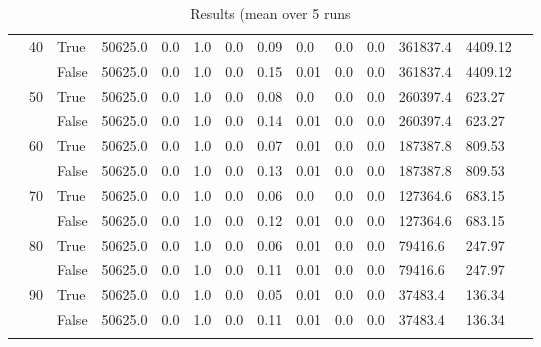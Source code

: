 \begin{landscape}
\begin{small}
\begin{longtable}[c]{@{}lll|ll|ll|ll|ll|lll@{}}
   & 40 & True  & 50625.0         & 0.0            & 1.0           & 0.0           & 0.09          & 0.0           & 0.0           & 0.0           & 361837.4      & 4409.12     &  \\
   &    & False & 50625.0         & 0.0            & 1.0           & 0.0           & 0.15          & 0.01          & 0.0           & 0.0           & 361837.4      & 4409.12     &  \\
   & 50 & True  & 50625.0         & 0.0            & 1.0           & 0.0           & 0.08          & 0.0           & 0.0           & 0.0           & 260397.4      & 623.27      &  \\
   &    & False & 50625.0         & 0.0            & 1.0           & 0.0           & 0.14          & 0.01          & 0.0           & 0.0           & 260397.4      & 623.27      &  \\
   & 60 & True  & 50625.0         & 0.0            & 1.0           & 0.0           & 0.07          & 0.01          & 0.0           & 0.0           & 187387.8      & 809.53      &  \\
   &    & False & 50625.0         & 0.0            & 1.0           & 0.0           & 0.13          & 0.01          & 0.0           & 0.0           & 187387.8      & 809.53      &  \\
   & 70 & True  & 50625.0         & 0.0            & 1.0           & 0.0           & 0.06          & 0.0           & 0.0           & 0.0           & 127364.6      & 683.15      &  \\
   &    & False & 50625.0         & 0.0            & 1.0           & 0.0           & 0.12          & 0.01          & 0.0           & 0.0           & 127364.6      & 683.15      &  \\
   & 80 & True  & 50625.0         & 0.0            & 1.0           & 0.0           & 0.06          & 0.01          & 0.0           & 0.0           & 79416.6       & 247.97      &  \\
   &    & False & 50625.0         & 0.0            & 1.0           & 0.0           & 0.11          & 0.01          & 0.0           & 0.0           & 79416.6       & 247.97      &  \\
   & 90 & True  & 50625.0         & 0.0            & 1.0           & 0.0           & 0.05          & 0.01          & 0.0           & 0.0           & 37483.4       & 136.34      &  \\
   &    & False & 50625.0         & 0.0            & 1.0           & 0.0           & 0.11          & 0.01          & 0.0           & 0.0           & 37483.4       & 136.34      &  \\* \bottomrule
\caption{Results (mean over 5 runs}
\label{lab_res}\\
\end{longtable}
\end{small}
\end{landscape}
